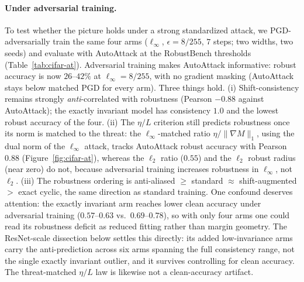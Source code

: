 \documentclass{article}
\theoremstyle{definition}
\begin{document}
\paragraph{Under adversarial training.} To test whether the picture holds under a strong standardized attack, we PGD-adversarially train \citep{madry2018towards} the same four arms ($\ell_\infty$, $\epsilon=8/255$, $7$ steps; two widths, two seeds) and evaluate with AutoAttack at the RobustBench thresholds (Table~\ref{tab:cifar-at}). Adversarial training makes AutoAttack informative: robust accuracy is now $26$--$42\%$ at $\ell_\infty=8/255$, with no gradient masking (AutoAttack stays below matched PGD for every arm). Three things hold. (i) Shift-consistency remains strongly \emph{anti}-correlated with robustness (Pearson $-0.88$ against AutoAttack); the exactly invariant model has consistency $1.0$ and the lowest robust accuracy of the four. (ii) The $\eta/L$ criterion still predicts robustness once its norm is matched to the threat: the $\ell_\infty$-matched ratio $\eta/\|\nabla M\|_1$, using the dual norm of the $\ell_\infty$ attack, tracks AutoAttack robust accuracy with Pearson $0.88$ (Figure~\ref{fig:cifar-at}), whereas the $\ell_2$ ratio ($0.55$) and the $\ell_2$ robust radius (near zero) do not, because adversarial training increases robustness in $\ell_\infty$, not $\ell_2$. (iii) The robustness ordering is anti-aliased $\ge$ standard $\approx$ shift-augmented $>$ exact cyclic, the same direction as standard training. One confound deserves attention: the exactly invariant arm reaches lower clean accuracy under adversarial training ($0.57$--$0.63$ vs.\ $0.69$--$0.78$), so with only four arms one could read its robustness deficit as reduced fitting rather than margin geometry. The ResNet-scale dissection below settles this directly: its added low-invariance arms carry the anti-prediction across six arms spanning the full consistency range, not the single exactly invariant outlier, and it survives controlling for clean accuracy. The threat-matched $\eta/L$ law is likewise not a clean-accuracy artifact.
\end{document}
